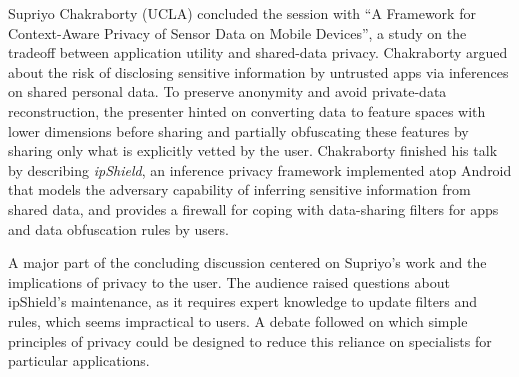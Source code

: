 Supriyo Chakraborty (UCLA) concluded the session with ``A
Framework for Context-Aware Privacy of Sensor Data on Mobile Devices'',
a study on the tradeoff between application utility and shared-data
privacy. Chakraborty argued about the risk of disclosing sensitive
information by untrusted apps via inferences on shared personal
data. To preserve anonymity and avoid private-data reconstruction, the
presenter hinted on converting data to feature spaces with lower
dimensions before sharing and partially obfuscating these features by
sharing only what is explicitly vetted by the user. Chakraborty finished
his talk by describing \emph{ipShield}, an inference privacy framework
implemented atop Android that models the adversary capability of
inferring sensitive information from shared data, and provides a
firewall for coping with data-sharing filters for apps and data
obfuscation rules by users.

A major part of the concluding discussion centered on Supriyo's work and
the implications of privacy to the user. The audience raised questions
about ipShield's maintenance, as it requires expert knowledge to update
filters and rules, which seems impractical to users. A debate followed
on which simple principles of privacy could be designed to reduce this
reliance on specialists for particular applications.
